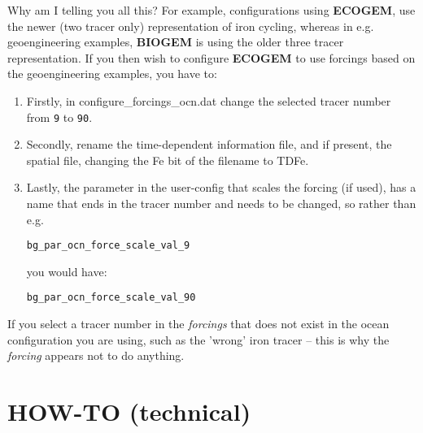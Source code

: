 \documentclass[11pt,fleqn]{book} %
\begin{document}
Why am I telling you all this? For example, configurations using \textbf{ECOGEM}, use the newer (two tracer only) representation of iron cycling, whereas in e.g. geoengineering examples, \textbf{BIOGEM} is using the older three tracer representation. If you then wish to configure \textbf{ECOGEM} to use forcings based on the geoengineering examples, you have to:

\begin{enumerate}[noitemsep]
\item Firstly, in \textsf{\footnotesize configure\_forcings\_ocn.dat} change the selected tracer number from \texttt{9} to \texttt{90}.
\item Secondly, rename the time-dependent information file, and if present, the spatial file, changing the \textsf{\footnotesize Fe} bit of the filename to \textsf{\footnotesize TDFe}.
\item Lastly, the parameter in the user-config that scales the forcing (if used), has a name that ends in the tracer number and needs to be changed, so rather than e.g.
\vspace{-1mm}\small\begin{verbatim}
bg_par_ocn_force_scale_val_9
\end{verbatim}\vspace{-1mm}\normalsize
you would have:
\vspace{-1mm}\small\begin{verbatim}
bg_par_ocn_force_scale_val_90
\end{verbatim}\vspace{-1mm}\normalsize

\end{enumerate}

If you select a tracer number in the \textit{forcings} that does not exist in the ocean configuration you are using, such as the 'wrong' iron tracer -- this is why the \textit{forcing} appears not to do anything.


\cleardoublepage


\chapter{HOW-TO (technical)}
\end{document}
